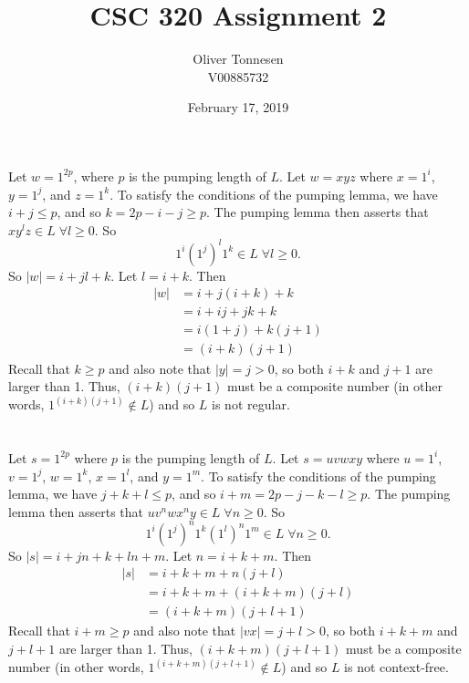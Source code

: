 \documentclass{article}
\title{CSC 320 Assignment 2}
\author{Oliver Tonnesen\\V00885732}
\date{February 17, 2019}
\begin{document}
\maketitle
\renewcommand{\thesubsection}{\thesection.\alph{subsection}}
\section{} %
Let $w=1^{2p}$, where $p$ is the pumping length of $L$. Let $w=xyz$ where
$x=1^i$, $y=1^j$, and $z=1^k$. To satisfy the conditions of the pumping lemma,
we have $i+j\le p$, and so $k=2p-i-j\ge p$. The pumping lemma then asserts that
$xy^lz\in L\;\forall l\ge0$. So
\[1^i(1^j)^l1^k\in L\;\forall l\ge0.\]
So $|w|=i+jl+k$. Let $l=i+k$. Then
\begin{align*}
	|w|&=i+j(i+k)+k\\
	&=i+ij+jk+k\\
	&=i(1+j)+k(j+1)\\
	&=(i+k)(j+1)
\end{align*}
Recall that $k\ge p$ and also note that $|y|=j>0$, so both $i+k$ and $j+1$ are
larger than 1. Thus, $(i+k)(j+1)$ must be a composite number (in other words,
$1^{(i+k)(j+1)}\not\in L$) and so $L$ is not regular.
\section{} %
Let $s=1^{2p}$ where $p$ is the pumping length of $L$. Let $s=uvwxy$ where
$u=1^i$, $v=1^j$, $w=1^k$, $x=1^l$, and $y=1^m$. To satisfy the conditions of
the pumping lemma, we have $j+k+l\le p$, and so $i+m=2p-j-k-l\ge p$. The
pumping lemma then asserts that $uv^nwx^ny\in L\;\forall n\ge0$. So
\[1^i(1^j)^n1^k(1^l)^n1^m\in L\;\forall n\ge0.\]
So $|s|=i+jn+k+ln+m$. Let $n=i+k+m$. Then
\begin{align*}
	|s|&=i+k+m+n(j+l)\\
	&=i+k+m+(i+k+m)(j+l)\\
	&=(i+k+m)(j+l+1)
\end{align*}
Recall that $i+m\ge p$ and also note that $|vx|=j+l>0$, so both $i+k+m$ and
$j+l+1$ are larger than 1. Thus, $(i+k+m)(j+l+1)$ must be a composite number
(in other words, $1^{(i+k+m)(j+l+1)}\not\in L$) and so $L$ is not context-free.
\end{document}
